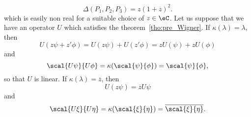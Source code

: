 \[
  \Delta(P_1,P_2,P_3)=z(1+\overline{z})^2.
\]
which is easily non real for a suitable choice of $z\in\eC$. Let us suppose that we have an operator $U$ which satisfies the theorem~\ref{tho:pre_Wigner}. If $\kappa(\lambda)=\lambda$, then
\begin{equation}
U(z\psi+z'\phi)=U(z\psi)+U(z'\phi)
               =zU(\psi)+zU(\phi)
\end{equation}
and
\begin{equation}
\scal{U\psi}{U\phi}=\kappa(\scal{\psi}{\phi})
	=\scal{\psi}{\phi},
\end{equation}
so that $U$ is linear. If $\kappa(\lambda)=\overline{z}$, then
\begin{equation}
 U(z\psi)=\overline{z}U\psi
\end{equation}
and
\begin{equation}
\scal{U\xi}{U\eta}=\kappa(\scal{\xi}{\eta})
                  =\overline{\scal{\xi}{\eta}}.
\end{equation}


